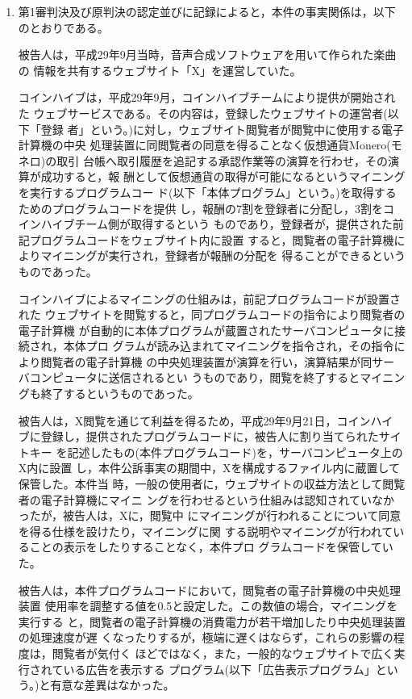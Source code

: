 \documentclass[12pt,a4paper]{ltjsarticle}
\begin{document}
\begin{enumerate}
  \item 第1審判決及び原判決の認定並びに記録によると，本件の事実関係は，以下
        のとおりである。

        被告人は，平成29年9月当時，音声合成ソフトウェアを用いて作られた楽曲の
        情報を共有するウェブサイト「X」を運営していた。

        コインハイブは，平成29年9月，コインハイブチームにより提供が開始された
        ウェブサービスである。その内容は，登録したウェブサイトの運営者(以下「登録
        者」という。)に対し，ウェブサイト閲覧者が閲覧中に使用する電子計算機の中央
        処理装置に同閲覧者の同意を得ることなく仮想通貨Monero(モネロ)の取引
        台帳へ取引履歴を追記する承認作業等の演算を行わせ，その演算が成功すると，報
        酬として仮想通貨の取得が可能になるというマイニングを実行するプログラムコー
        ド(以下「本体プログラム」という。)を取得するためのプログラムコードを提供
        し，報酬の7割を登録者に分配し，3割をコインハイブチーム側が取得するという
        ものであり，登録者が，提供された前記プログラムコードをウェブサイト内に設置
        すると，閲覧者の電子計算機によりマイニングが実行され，登録者が報酬の分配を
        得ることができるというものであった。

        コインハイブによるマイニングの仕組みは，前記プログラムコードが設置された
        ウェブサイトを閲覧すると，同プログラムコードの指令により閲覧者の電子計算機
        が自動的に本体プログラムが蔵置されたサーバコンピュータに接続され，本体プロ
        グラムが読み込まれてマイニングを指令され，その指令により閲覧者の電子計算機
        の中央処理装置が演算を行い，演算結果が同サーバコンピュータに送信されるとい
        うものであり，閲覧を終了するとマイニングも終了するというものであった。

        被告人は，X閲覧を通じて利益を得るため，平成29年9月21日，コインハイ
        ブに登録し，提供されたプログラムコードに，被告人に割り当てられたサイトキー
        を記述したもの(本件プログラムコード)を，サーバコンピュータ上のX内に設置
        し，本件公訴事実の期間中，Xを構成するファイル内に蔵置して保管した。本件当
        時，一般の使用者に，ウェブサイトの収益方法として閲覧者の電子計算機にマイニ
        ングを行わせるという仕組みは認知されていなかったが，被告人は，Xに，閲覧中
        にマイニングが行われることについて同意を得る仕様を設けたり，マイニングに関
        する説明やマイニングが行われていることの表示をしたりすることなく，本件プロ
        グラムコードを保管していた。

        被告人は，本件プログラムコードにおいて，閲覧者の電子計算機の中央処理装置
        使用率を調整する値を0.5と設定した。この数値の場合，マイニングを実行する
        と，閲覧者の電子計算機の消費電力が若干増加したり中央処理装置の処理速度が遅
        くなったりするが，極端に遅くはならず，これらの影響の程度は，閲覧者が気付く
        ほどではなく，また，一般的なウェブサイトで広く実行されている広告を表示する
        プログラム(以下「広告表示プログラム」という。)と有意な差異はなかった。
 \end{enumerate}
\end{document}
